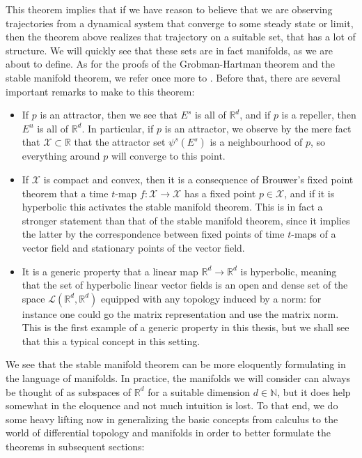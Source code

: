 \documentclass[11pt, a4paper]{memoir}
\theoremstyle{break}
\theoremstyle{break}
\theoremstyle{nonumberplain}
\newcommand{\mN}{\mathbb{N}}
\newcommand{\mR}{\mathbb{R}}
\begin{document}
This theorem implies that if we have reason to believe that we are observing trajectories from a dynamical system that converge to some steady state or limit, then the theorem above realizes that trajectory on a suitable set, that has a lot of structure. We will quickly see that these sets are in fact manifolds, as we are about to define. As for the proofs of the Grobman-Hartman theorem and the stable manifold theorem, we refer once more to \cite{Dynamics}. Before that, there are several important remarks to make to this theorem:
\begin{itemize}
	\item If $p$ is an attractor, then we see that $E^s$ is all of $\mR^d$, and if $p$ is a repeller, then $E^u$ is all of $\mR^d$. In particular, if $p$ is an attractor, we observe by the mere fact that $\mathcal{X}\subset \mR$ that the attractor set $\psi^s(E^s)$ is a neighbourhood of $p$, so everything around $p$ will converge to this point. 
	\item If $\mathcal{X}$ is compact and convex, then it is a consequence of Brouwer's fixed point theorem that a time $t$-map $f:\mathcal{X}\to\mathcal{X}$ has a fixed point $p\in \mathcal{X}$, and if it is hyperbolic this activates the stable manifold theorem. This is in fact a stronger statement than that of the stable manifold theorem, since it implies the latter by the correspondence between fixed points of time $t$-maps of a vector field and stationary points of the vector field.
	\item It is a generic property that a linear map $\mR^d\to\mR^d$ is hyperbolic, meaning that the set of hyperbolic linear vector fields is an open and dense set of the space $\mathcal{L}(\mR^d,\mR^d)$ equipped with any topology induced by a norm: for instance one could go the matrix representation and use the matrix norm. This is the first example of a generic property in this thesis, but we shall see that this a typical concept in this setting.
\end{itemize}
We see that the stable manifold theorem can be more eloquently formulating in the language of manifolds. In practice, the manifolds we will consider can always be thought of as subspaces of $\mR^d$ for a suitable dimension $d\in \mN$, but it does help somewhat in the eloquence and not much intuition is lost. To that end, we do some heavy lifting now in generalizing the basic concepts from calculus to the world of differential topology and manifolds in order to better formulate the theorems in subsequent sections:
\end{document}
